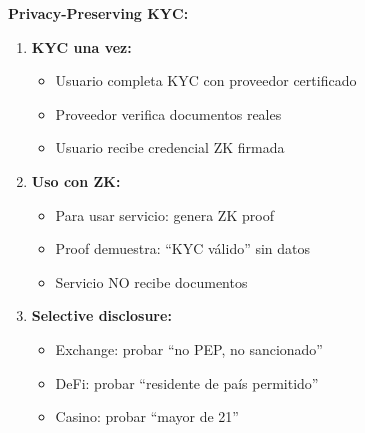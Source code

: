 \documentclass[11pt,a4paper,twoside]{book}
\theoremstyle{definition}
\theoremstyle{remark}
\begin{document}
\begin{keyidea}
\textbf{Privacy-Preserving KYC:}

\begin{enumerate}
    \item \textbf{KYC una vez:}
    \begin{itemize}
        \item Usuario completa KYC con proveedor certificado
        \item Proveedor verifica documentos reales
        \item Usuario recibe credencial ZK firmada
    \end{itemize}
    
    \item \textbf{Uso con ZK:}
    \begin{itemize}
        \item Para usar servicio: genera ZK proof
        \item Proof demuestra: ``KYC válido'' sin datos
        \item Servicio NO recibe documentos
    \end{itemize}
    
    \item \textbf{Selective disclosure:}
    \begin{itemize}
        \item Exchange: probar ``no PEP, no sancionado''
        \item DeFi: probar ``residente de país permitido''
        \item Casino: probar ``mayor de 21''
    \end{itemize}
\end{enumerate}
\end{keyidea}
\end{document}
